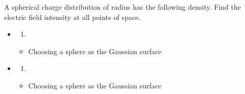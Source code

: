 
\begin{ELexample}{}

A spherical charge distribution of radius  has the following density. Find the electric field intensity at all points of space.


\begin{ELsolution}


\begin{itemize}
\item
  \begin{enumerate}
  \def\labelenumi{(\alph{enumi})}
  \tightlist
  \item
  \end{enumerate}

  \begin{itemize}
  \tightlist
  \item
    Choosing a sphere as the Gaussian surface
  \end{itemize}
\end{itemize}


\begin{itemize}
\item
  \begin{enumerate}
  \def\labelenumi{(\alph{enumi})}
  \setcounter{enumi}{1}
  \tightlist
  \item
  \end{enumerate}

  \begin{itemize}
  \tightlist
  \item
    Choosing a sphere as the Gaussian surface
  \end{itemize}
\end{itemize}


\end{ELsolution}

\end{ELexample}

